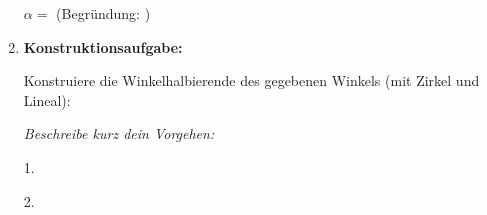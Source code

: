 \begin{enumerate}[label=\arabic*., resume]
    $\alpha = $ \underline{\hspace{2cm}} (Begründung: \underline{\hspace{4cm}})

    \vspace{1cm}

    \item \textbf{Konstruktionsaufgabe:}

    Konstruiere die Winkelhalbierende des gegebenen Winkels (mit Zirkel und Lineal):

    \vspace{0.5cm}

    \begin{center}
    \end{center}

    \textit{Beschreibe kurz dein Vorgehen:}

    1. \underline{\hspace{8cm}}

    2. \underline{\hspace{8cm}}

\end{enumerate}